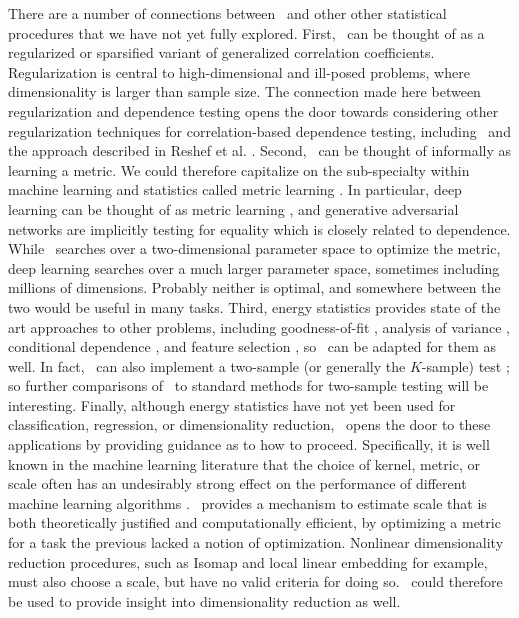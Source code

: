 \documentclass[11pt]{article}
\begin{document}
There are a number of  connections between \Mgc~and other other statistical procedures that we have not yet fully explored. First,  \Mgc~can be thought of as a regularized or sparsified variant of generalized correlation coefficients.  Regularization is central to high-dimensional and ill-posed problems, where dimensionality is larger than sample size. The connection made here between regularization and dependence testing opens the door towards considering other regularization techniques for correlation-based dependence testing, including \Hhg~and the approach described in Reshef et al. \cite{Reshef2011}. Second, \Mgc~can be thought of informally as  learning a metric.  We could therefore capitalize on the sub-specialty within machine learning and statistics called metric learning \cite{xing2003distance}.  In particular, deep learning  can be thought of as metric learning \cite{giryes2015deep}, and generative adversarial networks \cite{goodfellow2014generative} are implicitly testing for equality which is closely related to dependence.  While \Mgc~searches over a two-dimensional parameter space to optimize the metric, deep learning searches over a much larger parameter space, sometimes including millions of dimensions.  Probably neither is optimal, and somewhere between the two would be useful in many tasks.  Third, energy statistics provides state of the art approaches to other problems,  including goodness-of-fit  \cite{Szekely2005}, analysis of variance  \cite{Rizzo2010}, conditional dependence  \cite{Szekely2014,Wang2015},   and feature selection \cite{LiZhongZhu2012,Zhong2015}, so  \Mgc~can be adapted for them as well.
In fact, \Mgc~can also implement a two-sample (or generally the $K$-sample) test \cite{Szekely2004, heller2016consistent}; so further comparisons of \Mgc~to standard methods for two-sample testing will be interesting. Finally, although energy statistics have not yet been used for classification, regression, or dimensionality reduction, \Mgc~opens the door to these applications by providing guidance as to how to proceed. 
Specifically, it is well known in the machine learning literature that the choice of kernel, metric, or scale often has an undesirably strong effect on the performance of different machine learning algorithms \cite{levina2004maximum}. \Mgc~provides a mechanism to estimate scale that is both theoretically justified and computationally efficient, by optimizing a metric for a task the previous lacked a notion of optimization.  Nonlinear dimensionality reduction procedures, such as  Isomap \cite{TenenbaumSilvaLangford2000} and local linear embedding \cite{SaulRoweis2000} for example, must also choose a scale, but have no valid criteria for doing so.  \Mgc~could therefore be used to provide insight into dimensionality reduction as well.
\end{document}
